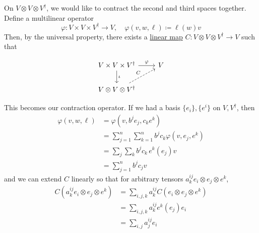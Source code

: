 	\begin{example}
	  \label{ex:contraction-of-rank-2-1-tensor}
	  On $V \otimes V \otimes V^\dagger$, we would like to contract the second and third spaces together. Define a multilinear operator 
		\begin{equation}
			\varphi: V \times V \times V^\dagger \to V, \quad \varphi(v, w, \ell) \coloneqq \ell(w) v
		\end{equation}
		Then, by the universal property, there exists a \hyperref[def:linear_map]{linear map} $C: V \otimes V \otimes V^\dagger \to V$ such that 
		\begin{figure}[H]
			\centering 
			\begin{equation}
			  \begin{tikzcd}
			  				V \times V \times V^\dagger \arrow[r, "\varphi"] \arrow[d, "\iota"] & V \\
			  				V \otimes V \otimes V^\dagger \arrow[ru, dashed, "C"]
			  			\end{tikzcd}
			\end{equation}
			\caption{} 
		\end{figure}

		This becomes our contraction operator. If we had a basis $\{e_i\}, \{e^i\}$ on $V, V^\dagger$, then 
		\begin{align}
			\varphi(v, w, \ell) & = \varphi(v, b^j e_j, c_k e^k) \\ 
													& = \sum_{j=1}^n \sum_{k=1}^n b^j c_k \varphi(v, e_j, e^k) \\ 
													& = \sum_j \sum_k b^j c_k \, e^k (e_j) v \\ 
													& = \sum_{j=1}^n b^j c_j v
		\end{align}
		and we can extend $C$ linearly so that for arbitrary tensors $a^{ij}_k e_i \otimes e_j \otimes e^k$, 
		\begin{align}
			C(a^{ij}_k e_i \otimes e_j \otimes e^k) & = \sum_{i, j, k} a^{ij}_k C(e_i \otimes e_j \otimes e^k) \\ 
																							& = \sum_{i, j, k} a^{ij}_k e^k(e_j) e_i \\ 
																							& = \sum_{i, j} a^{ij}_j e_i
		\end{align}
	\end{example}

